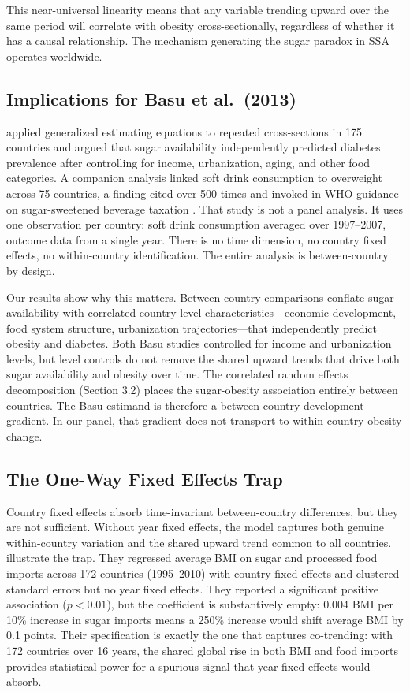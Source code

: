 \documentclass[letterpaper,11pt,leqno]{article}
\begin{document}
This near-universal linearity means that any variable trending upward over the same period will correlate with obesity cross-sectionally, regardless of whether it has a causal relationship. The mechanism generating the sugar paradox in SSA operates worldwide.

\subsection{Implications for Basu et al.\ (2013)}

\citet{basu2013} applied generalized estimating equations to repeated cross-sections in 175 countries and argued that sugar availability independently predicted diabetes prevalence after controlling for income, urbanization, aging, and other food categories. A companion analysis \citep{basu2013ajph} linked soft drink consumption to overweight across 75 countries, a finding cited over 500 times and invoked in WHO guidance on sugar-sweetened beverage taxation \citep{who2023ssb}. That study is not a panel analysis. It uses one observation per country: soft drink consumption averaged over 1997--2007, outcome data from a single year. There is no time dimension, no country fixed effects, no within-country identification. The entire analysis is between-country by design.

Our results show why this matters. Between-country comparisons conflate sugar availability with correlated country-level characteristics---economic development, food system structure, urbanization trajectories---that independently predict obesity and diabetes. Both Basu studies controlled for income and urbanization levels, but level controls do not remove the shared upward trends that drive both sugar availability and obesity over time. The correlated random effects decomposition (Section 3.2) places the sugar-obesity association entirely between countries. The Basu estimand is therefore a between-country development gradient. In our panel, that gradient does not transport to within-country obesity change.

\subsection{The One-Way Fixed Effects Trap}

Country fixed effects absorb time-invariant between-country differences, but they are not sufficient. Without year fixed effects, the model captures both genuine within-country variation and the shared upward trend common to all countries. \citet{lin2018} illustrate the trap. They regressed average BMI on sugar and processed food imports across 172 countries (1995--2010) with country fixed effects and clustered standard errors but no year fixed effects. They reported a significant positive association ($p < 0.01$), but the coefficient is substantively empty: 0.004 BMI per 10\% increase in sugar imports means a 250\% increase would shift average BMI by 0.1 points. Their specification is exactly the one that captures co-trending: with 172 countries over 16 years, the shared global rise in both BMI and food imports provides statistical power for a spurious signal that year fixed effects would absorb.
\end{document}
